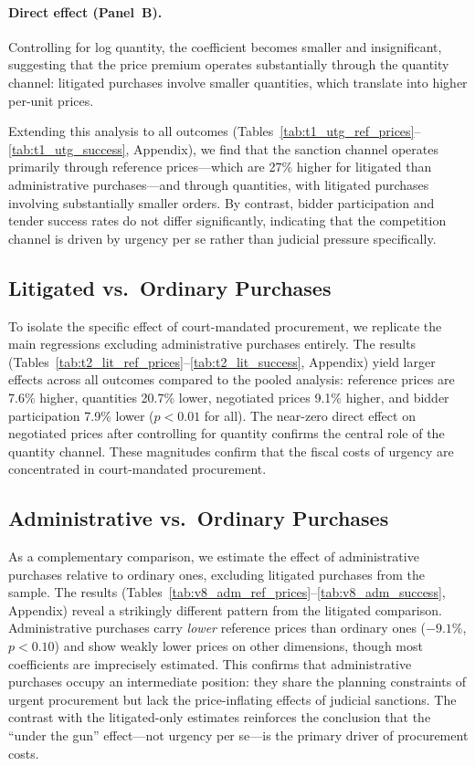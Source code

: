 \paragraph{Direct effect (Panel~B).}
Controlling for log quantity, the coefficient becomes smaller and insignificant, suggesting that the price premium operates substantially through the quantity channel: litigated purchases involve smaller quantities, which translate into higher per-unit prices.

Extending this analysis to all outcomes (Tables~\ref{tab:t1_utg_ref_prices}--\ref{tab:t1_utg_success}, Appendix), we find that the sanction channel operates primarily through reference prices---which are 27\% higher for litigated than administrative purchases---and through quantities, with litigated purchases involving substantially smaller orders. By contrast, bidder participation and tender success rates do not differ significantly, indicating that the competition channel is driven by urgency per se rather than judicial pressure specifically.

\subsection{Litigated vs.\ Ordinary Purchases}
\label{sec:litigated_only}

To isolate the specific effect of court-mandated procurement, we replicate the main regressions excluding administrative purchases entirely. The results (Tables~\ref{tab:t2_lit_ref_prices}--\ref{tab:t2_lit_success}, Appendix) yield larger effects across all outcomes compared to the pooled analysis: reference prices are 7.6\% higher, quantities 20.7\% lower, negotiated prices 9.1\% higher, and bidder participation 7.9\% lower ($p < 0.01$ for all). The near-zero direct effect on negotiated prices after controlling for quantity confirms the central role of the quantity channel. These magnitudes confirm that the fiscal costs of urgency are concentrated in court-mandated procurement.

\subsection{Administrative vs.\ Ordinary Purchases}
\label{sec:adm_vs_ord}

As a complementary comparison, we estimate the effect of administrative purchases relative to ordinary ones, excluding litigated purchases from the sample. The results (Tables~\ref{tab:v8_adm_ref_prices}--\ref{tab:v8_adm_success}, Appendix) reveal a strikingly different pattern from the litigated comparison. Administrative purchases carry \textit{lower} reference prices than ordinary ones ($-9.1$\%, $p < 0.10$) and show weakly lower prices on other dimensions, though most coefficients are imprecisely estimated. This confirms that administrative purchases occupy an intermediate position: they share the planning constraints of urgent procurement but lack the price-inflating effects of judicial sanctions. The contrast with the litigated-only estimates reinforces the conclusion that the ``under the gun'' effect---not urgency per se---is the primary driver of procurement costs.

